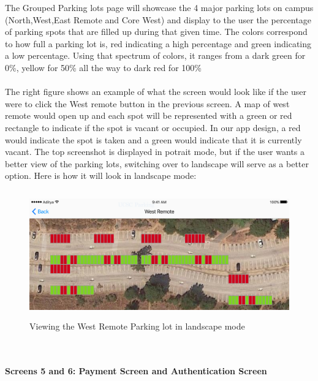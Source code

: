 \documentclass[paper=a4, fontsize=12pt]{scrartcl}
\numberwithin{equation}{section}		%
\numberwithin{figure}{section}			%
\numberwithin{table}{section}				%
\begin{document}
The Grouped Parking lots page will showcase the 4 major parking lots on campus (North,West,East Remote and Core West) and display to the user the percentage of parking spots that are filled up during that given time. The colors correspond to how full a parking lot is, red indicating a high percentage and green indicating a low percentage. Using that spectrum of colors, it ranges from a dark green for 0\%, yellow for 50\% all the way to dark red for 100\%
\\\\
The right figure shows an example of what the screen would look like if the user were to click the West remote button in the previous screen. A map of west remote would open up and each spot will be represented with a green or red rectangle to indicate if the spot is vacant or occupied. In our app design, a red would indicate the spot is taken and a green would indicate that it is currently vacant. The top screenshot is displayed in potrait mode, but if the user wants a better view of the parking lots, switching over to landscape will serve as a better option. Here is how it will look in landscape mode:
\begin{figure}[H]
\centering
\includegraphics[width=15cm, height=5.5cm]{MobileAppPics/App Design 4.pdf}
\caption{Viewing the West Remote Parking lot in landscape mode}
\label{adminReserve}
\end{figure}
\\\\
\textbf{Screens 5 and 6: Payment Screen and Authentication Screen}
\end{document}
